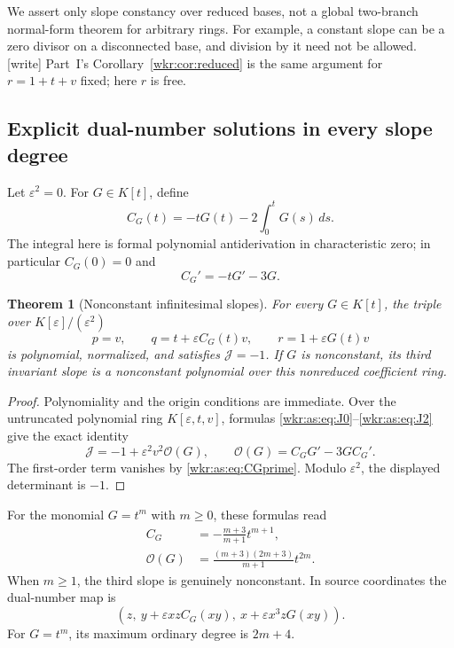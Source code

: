 \documentclass[11pt,a4paper]{article}
\numberwithin{equation}{section}
\newtheorem{theorem}{Theorem}[section]
\theoremstyle{definition}
\theoremstyle{remark}
\newcommand{\J}{\mathcal{J}}
\newcommand{\eps}{\varepsilon}
\begin{document}
We assert only slope constancy over reduced bases, not a global
two-branch normal-form theorem for arbitrary rings. For example, a
constant slope can be a zero divisor on a disconnected base, and division
by it need not be allowed.
\textup{[write]} Part~I's Corollary~\ref{wkr:cor:reduced} is the same
argument for $r=1+t+v$ fixed; here $r$ is free.

\subsection{Explicit dual-number solutions in every slope degree}

Let $\eps^2=0$. For $G\in K[t]$, define
\begin{equation}\label{wkr:as:eq:CG}
C_G(t)=-tG(t)-2\int_0^tG(s)\,ds.
\end{equation}
The integral here is formal polynomial antiderivation in characteristic
zero; in particular $C_G(0)=0$ and
\begin{equation}\label{wkr:as:eq:CGprime}
C_G'=-tG'-3G.
\end{equation}

\begin{theorem}[Nonconstant infinitesimal slopes]\label{wkr:as:thm:dual}
For every $G\in K[t]$, the triple over $K[\eps]/(\eps^2)$
\begin{equation}\label{wkr:as:eq:dual-example}
p=v,\qquad q=t+\eps C_G(t)v,\qquad r=1+\eps G(t)v
\end{equation}
is polynomial, normalized, and satisfies $\J=-1$. If $G$ is nonconstant,
its third invariant slope is a nonconstant polynomial over this
nonreduced coefficient ring.
\end{theorem}
\begin{proof}
Polynomiality and the origin conditions are immediate. Over the
untruncated polynomial ring $K[\eps,t,v]$, formulas
\eqref{wkr:as:eq:J0}--\eqref{wkr:as:eq:J2} give the exact identity
\begin{equation}\label{wkr:as:eq:exact-dual}
\J=-1+\eps^2v^2\mathcal O(G),\qquad
\mathcal O(G)=C_GG'-3GC_G'.
\end{equation}
The first-order term vanishes by \eqref{wkr:as:eq:CGprime}. Modulo
$\eps^2$, the displayed determinant is $-1$.
\end{proof}

For the monomial $G=t^m$ with $m\ge0$, these formulas read
\begin{align}
C_G&=-\frac{m+3}{m+1}t^{m+1},\label{wkr:as:eq:monomialC}\\
\mathcal O(G)&=\frac{(m+3)(2m+3)}{m+1}t^{2m}.\label{wkr:as:eq:monomialO}
\end{align}
When $m\ge1$, the third slope is genuinely nonconstant. In source
coordinates the dual-number map is
\begin{equation}\label{wkr:as:eq:dual-lift}
\left(z,\ y+\eps xz C_G(xy),\ x+\eps x^3zG(xy)\right).
\end{equation}
For $G=t^m$, its maximum ordinary degree is $2m+4$.
\end{document}
